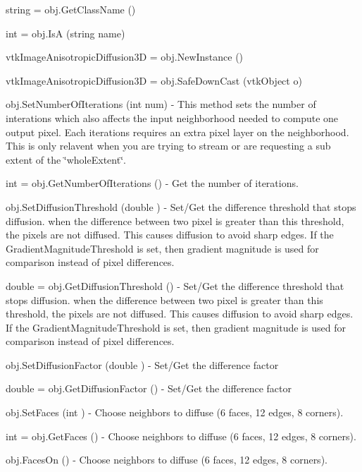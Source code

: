 \begin{DoxyItemize}
\item {\ttfamily string = obj.\-Get\-Class\-Name ()}  
\item {\ttfamily int = obj.\-Is\-A (string name)}  
\item {\ttfamily vtk\-Image\-Anisotropic\-Diffusion3\-D = obj.\-New\-Instance ()}  
\item {\ttfamily vtk\-Image\-Anisotropic\-Diffusion3\-D = obj.\-Safe\-Down\-Cast (vtk\-Object o)}  
\item {\ttfamily obj.\-Set\-Number\-Of\-Iterations (int num)} -\/ This method sets the number of interations which also affects the input neighborhood needed to compute one output pixel. Each iterations requires an extra pixel layer on the neighborhood. This is only relavent when you are trying to stream or are requesting a sub extent of the \char`\"{}whole\-Extent\char`\"{}.  
\item {\ttfamily int = obj.\-Get\-Number\-Of\-Iterations ()} -\/ Get the number of iterations.  
\item {\ttfamily obj.\-Set\-Diffusion\-Threshold (double )} -\/ Set/\-Get the difference threshold that stops diffusion. when the difference between two pixel is greater than this threshold, the pixels are not diffused. This causes diffusion to avoid sharp edges. If the Gradient\-Magnitude\-Threshold is set, then gradient magnitude is used for comparison instead of pixel differences.  
\item {\ttfamily double = obj.\-Get\-Diffusion\-Threshold ()} -\/ Set/\-Get the difference threshold that stops diffusion. when the difference between two pixel is greater than this threshold, the pixels are not diffused. This causes diffusion to avoid sharp edges. If the Gradient\-Magnitude\-Threshold is set, then gradient magnitude is used for comparison instead of pixel differences.  
\item {\ttfamily obj.\-Set\-Diffusion\-Factor (double )} -\/ Set/\-Get the difference factor  
\item {\ttfamily double = obj.\-Get\-Diffusion\-Factor ()} -\/ Set/\-Get the difference factor  
\item {\ttfamily obj.\-Set\-Faces (int )} -\/ Choose neighbors to diffuse (6 faces, 12 edges, 8 corners).  
\item {\ttfamily int = obj.\-Get\-Faces ()} -\/ Choose neighbors to diffuse (6 faces, 12 edges, 8 corners).  
\item {\ttfamily obj.\-Faces\-On ()} -\/ Choose neighbors to diffuse (6 faces, 12 edges, 8 corners).  

\end{DoxyItemize}

